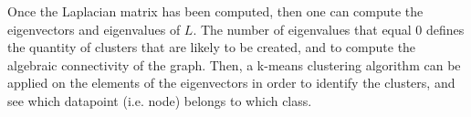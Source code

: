 \begin{appendices}
Once the Laplacian matrix has been computed, then one can compute the eigenvectors and eigenvalues of $L$. The number of eigenvalues that equal 0 defines the quantity of clusters that are likely to be created, and to compute the algebraic connectivity of the graph. Then, a k-means clustering algorithm can be applied on the elements of the eigenvectors in order to identify the clusters, and see which datapoint (i.e. node) belongs to which class.

\end{appendices}
